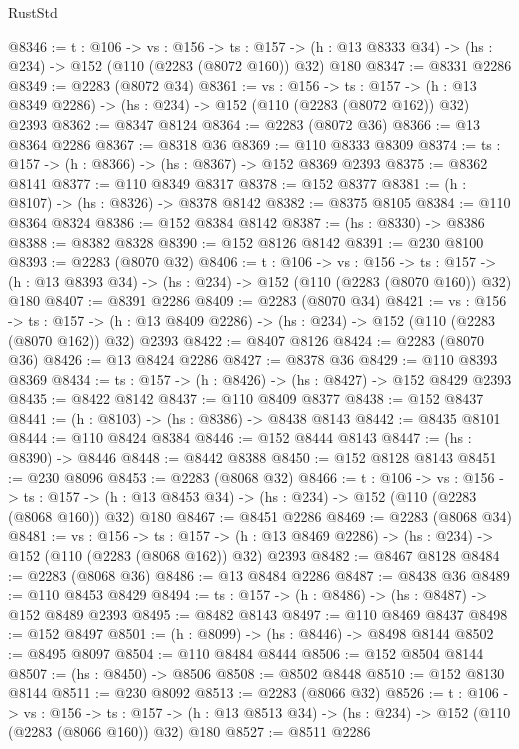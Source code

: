 \begin{lexlean}{RustStd}
\begin{coremodule}
@8346 := {t : @106} ->
  {vs : @156} ->
  {ts : @157} -> (h : @13 @8333 @34) -> (hs : @234) -> @152 (@110 (@2283 (@8072 @160)) @32) @180
@8347 := @8331 @2286
@8349 := @2283 (@8072 @34)
@8361 := {vs : @156} ->
  {ts : @157} -> (h : @13 @8349 @2286) -> (hs : @234) -> @152 (@110 (@2283 (@8072 @162)) @32) @2393
@8362 := @8347 @8124
@8364 := @2283 (@8072 @36)
@8366 := @13 @8364 @2286
@8367 := @8318 @36
@8369 := @110 @8333 @8309
@8374 := {ts : @157} -> (h : @8366) -> (hs : @8367) -> @152 @8369 @2393
@8375 := @8362 @8141
@8377 := @110 @8349 @8317
@8378 := @152 @8377
@8381 := (h : @8107) -> (hs : @8326) -> @8378 @8142
@8382 := @8375 @8105
@8384 := @110 @8364 @8324
@8386 := @152 @8384 @8142
@8387 := (hs : @8330) -> @8386
@8388 := @8382 @8328
@8390 := @152 @8126 @8142
@8391 := @230 @8100
@8393 := @2283 (@8070 @32)
@8406 := {t : @106} ->
  {vs : @156} ->
  {ts : @157} -> (h : @13 @8393 @34) -> (hs : @234) -> @152 (@110 (@2283 (@8070 @160)) @32) @180
@8407 := @8391 @2286
@8409 := @2283 (@8070 @34)
@8421 := {vs : @156} ->
  {ts : @157} -> (h : @13 @8409 @2286) -> (hs : @234) -> @152 (@110 (@2283 (@8070 @162)) @32) @2393
@8422 := @8407 @8126
@8424 := @2283 (@8070 @36)
@8426 := @13 @8424 @2286
@8427 := @8378 @36
@8429 := @110 @8393 @8369
@8434 := {ts : @157} -> (h : @8426) -> (hs : @8427) -> @152 @8429 @2393
@8435 := @8422 @8142
@8437 := @110 @8409 @8377
@8438 := @152 @8437
@8441 := (h : @8103) -> (hs : @8386) -> @8438 @8143
@8442 := @8435 @8101
@8444 := @110 @8424 @8384
@8446 := @152 @8444 @8143
@8447 := (hs : @8390) -> @8446
@8448 := @8442 @8388
@8450 := @152 @8128 @8143
@8451 := @230 @8096
@8453 := @2283 (@8068 @32)
@8466 := {t : @106} ->
  {vs : @156} ->
  {ts : @157} -> (h : @13 @8453 @34) -> (hs : @234) -> @152 (@110 (@2283 (@8068 @160)) @32) @180
@8467 := @8451 @2286
@8469 := @2283 (@8068 @34)
@8481 := {vs : @156} ->
  {ts : @157} -> (h : @13 @8469 @2286) -> (hs : @234) -> @152 (@110 (@2283 (@8068 @162)) @32) @2393
@8482 := @8467 @8128
@8484 := @2283 (@8068 @36)
@8486 := @13 @8484 @2286
@8487 := @8438 @36
@8489 := @110 @8453 @8429
@8494 := {ts : @157} -> (h : @8486) -> (hs : @8487) -> @152 @8489 @2393
@8495 := @8482 @8143
@8497 := @110 @8469 @8437
@8498 := @152 @8497
@8501 := (h : @8099) -> (hs : @8446) -> @8498 @8144
@8502 := @8495 @8097
@8504 := @110 @8484 @8444
@8506 := @152 @8504 @8144
@8507 := (hs : @8450) -> @8506
@8508 := @8502 @8448
@8510 := @152 @8130 @8144
@8511 := @230 @8092
@8513 := @2283 (@8066 @32)
@8526 := {t : @106} ->
  {vs : @156} ->
  {ts : @157} -> (h : @13 @8513 @34) -> (hs : @234) -> @152 (@110 (@2283 (@8066 @160)) @32) @180
@8527 := @8511 @2286

\end{coremodule}
\end{lexlean}

